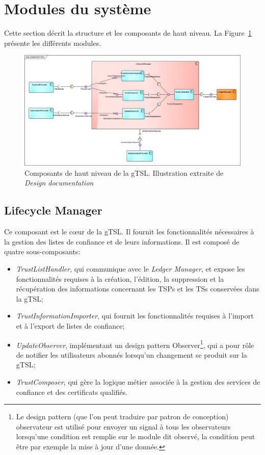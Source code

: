 \documentclass{tnreport}
\begin{document}
\section{Modules du système}
\label{sec:modules}

Cette section décrit la structure et les composants de haut niveau. La Figure~\ref{fig:highlevel-components} présente les différents modules.

\begin{figure}[h]
	\centering
	\includegraphics[scale=0.38]{figures/highlevel-components}
	\caption{Composants de haut niveau de la gTSL. Illustration extraite de \textit{Design documentation}~\cite{design-document}}
	\label{fig:highlevel-components}
\end{figure}

\subsection{Lifecycle Manager}

Ce composant est le cœur de la gTSL. Il fournit les fonctionnalités nécessaires à la gestion des listes de confiance et de leurs informations. Il est composé de quatre sous-composants:
\begin{itemize}
	\item \textit{TrustListHandler}, qui communique avec le \textit{Ledger Manager}, et expose les fonctionnalités requises à la création, l'édition, la suppression et la récupération des informations concernant les TSPs et les TSs conservées dans la gTSL;
	\item \textit{TrustInformationImporter}, qui fournit les fonctionnalités requises à l'import et à l'export de listes de confiance;
	\item \textit{UpdateObserver}, implémentant un design pattern Observer\footnote{Le design pattern (que l'on peut traduire par patron de conception) observateur est utilisé pour envoyer un signal à tous les observateurs lorsqu'une condition est remplie sur le module dit observé, la condition peut être par exemple la mise à jour d'une donnée.}, qui a pour rôle de notifier les utilisateurs abonnés lorsqu'un changement se produit sur la gTSL;
	\item \textit{TrustComposer}, qui gère la logique métier associée à la gestion des services de confiance et des certificats qualifiés.
\end{itemize}
\end{document}
